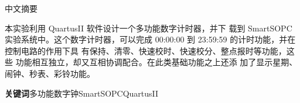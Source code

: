 \documentclass[twoside, openright]{article}
\begin{document}

\pagestyle{fancy}
\renewcommand{\headrulewidth}{0pt}
\fancyhead[LC, RC]{}
\fancyhead[LE, RO]{}
\fancyhead[RE, LO]{}
\fancyfoot[LC, RC]{}
\fancyfoot[LE, RO]{}
\fancyfoot[RE, LO]{}


\newpage

\begin{center}
	\renewcommand{\CJKglue}{\hskip 2pt}\heiti \Title 中文摘要

	\vspace{0.3em}

	\begin{boxedminipage}[][18cm]{\linewidth}
		\begin{spacing}{1.5}

			\vspace{1\ccwd}

			本实验利用 QuartusII 软件设计一个多功能数字计时器，并下
			载到 SmartSOPC 实验系统中。这个数字计时器，可以完成
			00:00:00 到 23:59:59 的计时功能，并在控制电路的作用下具
			有保持、清零、快速校时、快速校分、整点报时等功能，这些
			功能相互独立，却又互相协调配合。在此类基础功能之上还添
			加了显示星期、闹钟、秒表、彩铃功能。
			\cite{姜萍2008创新教育在, 2010数字逻辑电路基础, 孙敦艳2011硬件描述语言在数字逻辑电路教学中的应用}

			\vspace{2\ccwd}

			\noindent\textbf{关键词}\hspace{1\ccwd}多功能数字钟\hspace{1\ccwd}SmartSOPC\hspace{1\ccwd}QuartusII
		\end{spacing}
	\end{boxedminipage}
\end{center}


\newpage
\end{document}
